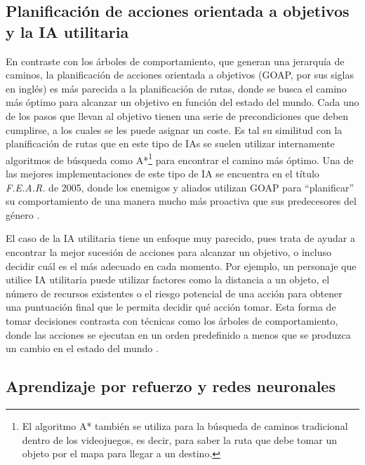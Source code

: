 \subsection{Planificación de acciones orientada a objetivos y la IA utilitaria}

En contraste con los árboles de comportamiento, que generan una jerarquía de caminos, la planificación de acciones orientada a objetivos (GOAP, por sus siglas en inglés) es más parecida a la planificación de rutas, donde se busca el camino más óptimo para alcanzar un objetivo en función del estado del mundo. Cada uno de los pasos que llevan al objetivo tienen una serie de precondiciones que deben cumplirse, a los cuales se les puede asignar un coste. Es tal su similitud con la planificación de rutas que en este tipo de IAs se suelen utilizar internamente algoritmos de búsqueda como A*\footnote{El algoritmo A* también se utiliza para la búsqueda de caminos tradicional dentro de los videojuegos, es decir, para saber la ruta que debe tomar un objeto por el mapa para llegar a un destino.} para encontrar el camino más óptimo. Una de las mejores implementaciones de este tipo de IA se encuentra en el título \textit{F.E.A.R.} de 2005, donde los enemigos y aliados utilizan GOAP para ``planificar'' su comportamiento de una manera mucho más proactiva que sus predecesores del género \cite{jeff_gdc_2006}.

El caso de la IA utilitaria tiene un enfoque muy parecido, pues trata de ayudar a encontrar la mejor sucesión de acciones para alcanzar un objetivo, o incluso decidir cuál es el más adecuado en cada momento. Por ejemplo, un personaje que utilice IA utilitaria puede utilizar factores como la distancia a un objeto, el número de recursos existentes o el riesgo potencial de una acción para obtener una puntuación final que le permita decidir qué acción tomar. Esta forma de tomar decisiones contrasta con técnicas como los árboles de comportamiento, donde las acciones se ejecutan en un orden predefinido a menos que se produzca un cambio en el estado del mundo \cite{thompson_ai_2024}.

\subsection{Aprendizaje por refuerzo y redes neuronales}

